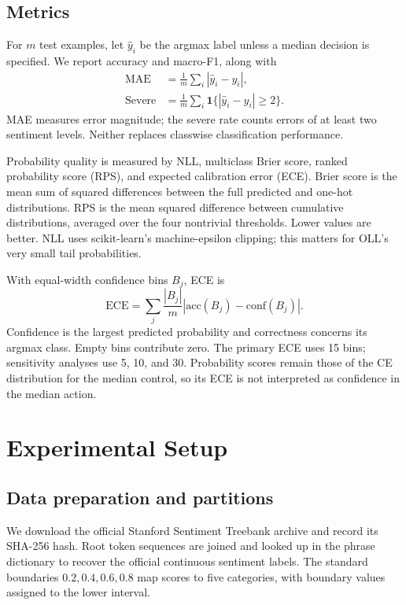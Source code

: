\documentclass[10pt,twocolumn]{article}
\begin{document}
\subsection{Metrics}
For $m$ test examples, let $\hat y_i$ be the argmax label unless a median decision is specified. We report accuracy and macro-F1, along with
\begin{equation}
 \begin{aligned}
 \mathrm{MAE}&=\frac{1}{m}\sum_i|\hat y_i-y_i|,\\
 \mathrm{Severe}&=\frac{1}{m}\sum_i\mathbf{1}\{|\hat y_i-y_i|\geq2\}.
 \end{aligned}
\end{equation}
MAE measures error magnitude; the severe rate counts errors of at least two sentiment levels. Neither replaces classwise classification performance.

Probability quality is measured by NLL, multiclass Brier score, ranked probability score (RPS), and expected calibration error (ECE). Brier score is the mean sum of squared differences between the full predicted and one-hot distributions. RPS is the mean squared difference between cumulative distributions, averaged over the four nontrivial thresholds. Lower values are better. NLL uses scikit-learn's machine-epsilon clipping; this matters for OLL's very small tail probabilities.

With equal-width confidence bins $B_j$, ECE is
\begin{equation}
 \mathrm{ECE}=\sum_j\frac{|B_j|}{m}
 \left|\mathrm{acc}(B_j)-\mathrm{conf}(B_j)\right|.
\end{equation}
Confidence is the largest predicted probability and correctness concerns its argmax class. Empty bins contribute zero. The primary ECE uses 15 bins; sensitivity analyses use 5, 10, and 30. Probability scores remain those of the CE distribution for the median control, so its ECE is not interpreted as confidence in the median action.

\section{Experimental Setup}
\subsection{Data preparation and partitions}
We download the official Stanford Sentiment Treebank archive and record its SHA-256 hash. Root token sequences are joined and looked up in the phrase dictionary to recover the official continuous sentiment labels. The standard boundaries $0.2,0.4,0.6,0.8$ map scores to five categories, with boundary values assigned to the lower interval.
\end{document}
